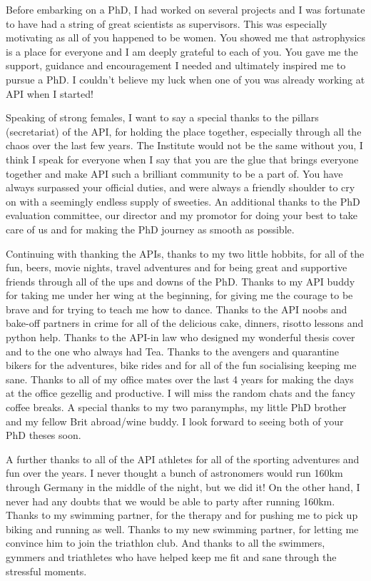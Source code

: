 Before embarking on a PhD, I had worked on several projects and I was fortunate to have had a string of great scientists as supervisors. This was especially motivating as all of you happened to be women. You showed me that astrophysics is a place for everyone and I am deeply grateful to each of you. You gave me the support, guidance and encouragement I needed and ultimately inspired me to pursue a PhD. I couldn’t believe my luck when one of you was already working at API when I started!

Speaking of strong females, I want to say a special thanks to the pillars (secretariat) of the API, for holding the place together, especially through all the chaos over the last few years. The Institute would not be the same without you, I think I speak for everyone when I say that you are the glue that brings everyone together and make API such a brilliant community to be a part of. You have always surpassed your official duties, and were always a friendly shoulder to cry on with a seemingly endless supply of sweeties. An additional thanks to the PhD evaluation committee, our director and my promotor for doing your best to take care of us and for making the PhD journey as smooth as possible.

Continuing with thanking the APIs, thanks to my two little hobbits, for all of the fun, beers, movie nights, travel adventures and for being great and supportive friends through all of the ups and downs of the PhD. Thanks to my API buddy for taking me under her wing at the beginning, for giving me the courage to be brave and for trying to teach me how to dance. Thanks to the API noobs and bake-off partners in crime for all of the delicious cake, dinners, risotto lessons and python help. Thanks to the API-in law who designed my wonderful thesis cover and to the one who always had Tea. Thanks to the avengers and quarantine bikers for the adventures, bike rides and for all of the fun socialising keeping me sane. Thanks to all of my office mates over the last 4 years for making the days at the office gezellig and productive. I will miss the random chats and the fancy coffee breaks. A special thanks to my two paranymphs, my little PhD brother and my fellow Brit abroad/wine buddy. I look forward to seeing both of your PhD theses soon.

A further thanks to all of the API athletes for all of the sporting adventures and fun over the years. I never thought a bunch of astronomers would run 160km through Germany in the middle of the night, but we did it! On the other hand, I never had any doubts that we would be able to party after running 160km. Thanks to my swimming partner, for the therapy and for pushing me to pick up biking and running as well. Thanks to my new swimming partner, for letting me convince him to join the triathlon club. And thanks to all the swimmers, gymmers and triathletes who have helped keep me fit and sane through the stressful moments.

